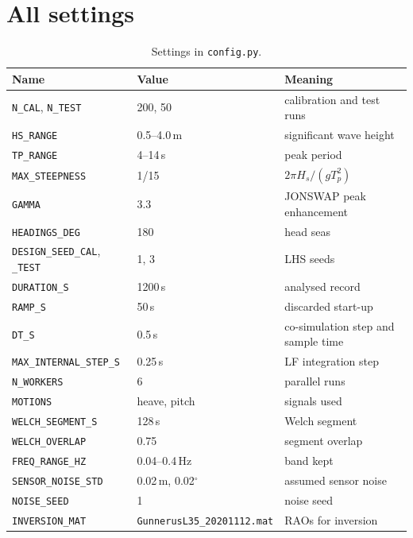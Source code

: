 \documentclass[11pt,a4paper]{article}
\newcommand{\Hs}{H_{s}}
\newcommand{\Tp}{T_{p}}
\begin{document}



\appendix
\section{All settings}
\label{app:config}

\begin{table}[htbp]
  \centering
  \caption{Settings in \texttt{config.py}.}
  \label{tab:config}
  \small
  \begin{tabular}{@{}lll@{}}
    \toprule
    Name & Value & Meaning \\
    \midrule
    \texttt{N\_CAL}, \texttt{N\_TEST} & 200, 50 & calibration and test runs \\
    \texttt{HS\_RANGE} & 0.5--4.0\,m & significant wave height \\
    \texttt{TP\_RANGE} & 4--14\,s & peak period \\
    \texttt{MAX\_STEEPNESS} & 1/15 & $2\pi\Hs/(g\Tp^2)$ \\
    \texttt{GAMMA} & 3.3 & JONSWAP peak enhancement \\
    \texttt{HEADINGS\_DEG} & 180 & head seas \\
    \texttt{DESIGN\_SEED\_CAL}, \texttt{\_TEST} & 1, 3 & LHS seeds \\
    \texttt{DURATION\_S} & 1200\,s & analysed record \\
    \texttt{RAMP\_S} & 50\,s & discarded start-up \\
    \texttt{DT\_S} & 0.5\,s & co-simulation step and sample time \\
    \texttt{MAX\_INTERNAL\_STEP\_S} & 0.25\,s & LF integration step \\
    \texttt{N\_WORKERS} & 6 & parallel runs \\
    \texttt{MOTIONS} & heave, pitch & signals used \\
    \texttt{WELCH\_SEGMENT\_S} & 128\,s & Welch segment \\
    \texttt{WELCH\_OVERLAP} & 0.75 & segment overlap \\
    \texttt{FREQ\_RANGE\_HZ} & 0.04--0.4\,Hz & band kept \\
    \texttt{SENSOR\_NOISE\_STD} & 0.02\,m, 0.02$^\circ$ & assumed sensor noise \\
    \texttt{NOISE\_SEED} & 1 & noise seed \\
    \texttt{INVERSION\_MAT} & \texttt{GunnerusL35\_20201112.mat} & RAOs for inversion \\

\end{tabular}
\end{table}
\end{document}
